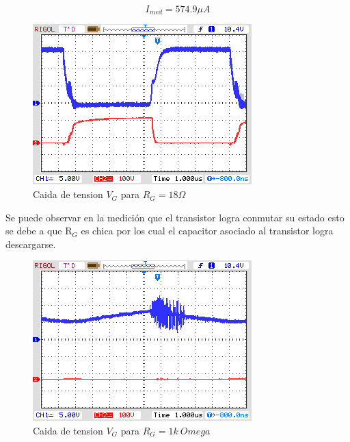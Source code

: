 \documentclass[a4paper,10pt]{article}
\begin{document}
\begin{equation}
	I_{med} = 574.9 \mu A
\end{equation}

\begin{figure}[H] %
\begin{center}
\includegraphics[scale=0.8]{./imagenes/igbt_medicion1_18ohm.png}
\caption{Caida de tension $V_ {G}$ para $R_ {G}=18\unit{\Omega}$}
 \label{fig:Corriente_IGBT_18ohm}
\end{center}
\end{figure}

Se puede observar en la medición que el transistor logra conmutar su estado esto se debe a que R$_ {G}$ es chica por los cual el capacitor asociado al transistor logra descargarse.

\begin{figure}[H] %
\begin{center}
\includegraphics[scale=0.8]{./imagenes/igbt_medicion1_1kohm.png}
\caption{Caida de tension $V_ {G}$ para $R_ {G}=1\unit{k\ Omega}$}
 \label{fig:Corriente_IGBT_1kohm}
\end{center}
\end{figure}
\end{document}

